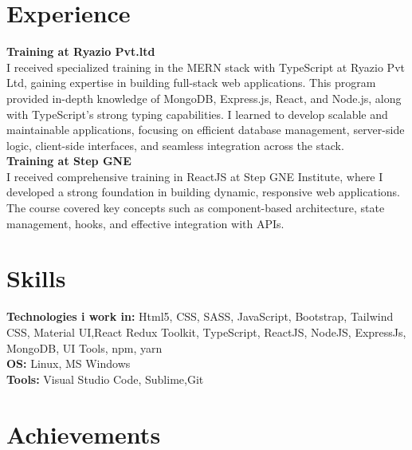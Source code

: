 \documentclass[letterpaper, 11pt]{article}
\newcommand{\secStartSpace}{\vspace{3pt}}
\newcommand{\secEndSpace}{\vspace{5pt}}
\begin{document}
\section{\color{blue} \textbf{Experience}}
\secStartSpace


\begin{addmargin}[1em]{1em}
\noindent \textbf{Training at Ryazio Pvt.ltd} 
\\
I received specialized training in the MERN stack with TypeScript at Ryazio Pvt Ltd, gaining expertise in building full-stack web applications. This program provided in-depth knowledge of MongoDB, Express.js, React, and Node.js, along with TypeScript's strong typing capabilities. I learned to develop scalable and maintainable applications, focusing on efficient database management, server-side logic, client-side interfaces, and seamless integration across the stack.
\\
\noindent \textbf{Training at Step GNE} 
\\
I received comprehensive training in ReactJS at Step GNE Institute, where I developed a strong foundation in building dynamic, responsive web applications. The course covered key concepts such as component-based architecture, state management, hooks, and effective integration with APIs.
\end{addmargin}
\secEndSpace

\section{\color{blue} \textbf{Skills}}
\secStartSpace

\begin{addmargin}[1em]{1em}
	\noindent \textbf{Technologies i work in:} Html5, CSS, SASS, JavaScript, Bootstrap, Tailwind CSS, Material UI,React Redux Toolkit, TypeScript, ReactJS, NodeJS, ExpressJs, MongoDB, UI Tools, npm, yarn \\
	\noindent \textbf{OS:} Linux, MS Windows\\
	\noindent \textbf{Tools:} Visual Studio Code, Sublime,Git
\end{addmargin}
\secEndSpace


\section{\color{blue} \textbf{Achievements}}
\secStartSpace
\end{document}
